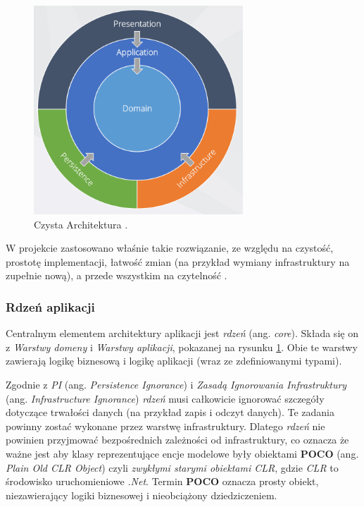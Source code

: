 \documentclass[12pt]{article}
\numberwithin{figure}{section}
\begin{document}
\begin{sloppypar}
\begin{figure}[H] 
    \centering
    \includegraphics[width=0.7\textwidth]{images/chapter_3/clean-architecture.png}
    \caption{Czysta Architektura \cite{clean-architecture}.}
    \label{fig:clean-architecture}
\end{figure}
    
W projekcie zastosowano właśnie takie rozwiązanie, ze względu na czystość, prostotę implementacji, łatwość zmian (na przykład wymiany infrastruktury na zupełnie nową), a przede wszystkim na czytelność \cite{clean-architecture}. 

    \subsubsection{Rdzeń aplikacji} \label{core}
    Centralnym elementem architektury aplikacji jest \textit{rdzeń} (ang. \textit{core}). Składa się on z \textit{Warstwy domeny} i \textit{Warstwy aplikacji}, pokazanej na rysunku \ref{fig:clean-architecture}. Obie te warstwy zawierają logikę biznesową i logikę aplikacji (wraz ze zdefiniowanymi typami). 
        
    Zgodnie z \textit{PI} (ang. \textit{Persistence Ignorance}) i \textit{Zasadą Ignorowania Infrastruktury} (ang.  \textit{Infrastructure Ignorance}) \textit{rdzeń} musi całkowicie ignorować szczegóły dotyczące trwałości danych (na przykład zapis i odczyt danych). Te zadania powinny zostać wykonane przez warstwę infrastruktury. Dlatego \textit{rdzeń} nie powinien przyjmować bezpośrednich zależności od infrastruktury, co oznacza że ważne jest aby klasy reprezentujące encje modelowe były obiektami \textbf{POCO} (ang. \textit{Plain Old CLR Object}) czyli \textit{zwykłymi starymi obiektami CLR}, gdzie \textit{CLR} to środowisko uruchomieniowe \textit{.Net}. Termin \textbf{POCO} oznacza prosty obiekt, niezawierający logiki biznesowej i nieobciążony dziedziczeniem.
        

\end{sloppypar}
\end{document}
